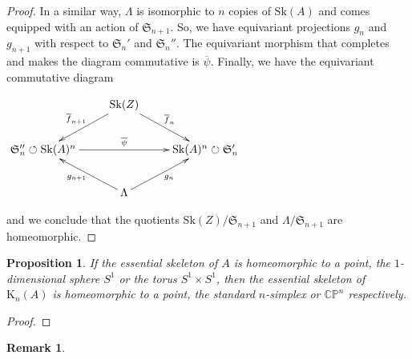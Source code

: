 \documentclass{amsart}%
\numberwithin{equation}{subsection}
\theoremstyle{plain2}
\newtheorem{prop}[equation]{Proposition}
\theoremstyle{definition2}
\newtheorem{rem}[equation]{Remark}
\theoremstyle{stepstyle}
\theoremstyle{point}
\theoremstyle{subpoint}
\newcommand{\CP}{\ensuremath{\mathbb{CP}}}
\newcommand{\Sk}{\mathrm{Sk}}
\begin{document}
\begin{proof}
In a similar way, $\Lambda$ is isomorphic to $n$ copies of $\Sk(A)$ and comes equipped with an action of $\mathfrak{S}_{n+1}$. So, we have equivariant projections $g_n$ and $g_{n+1}$ with respect to $\mathfrak{S}_n'$ and $\mathfrak{S}_n''$. The equivariant morphism that completes and makes the diagram commutative is $\overline{\psi}$. Finally, we have the equivariant commutative diagram
\begin{center}
\xymatrixrowsep{1pc}
\xymatrixrowsep{1pc}
$\xymatrix{
& \Sk(Z)  \ar[ld]_{\overline{f}_{n+1}} \ar[rd]^{\overline{f}_{n}}  &\\
\mathfrak{S}_n'' \circlearrowleft\Sk(A)^n  \ar[rr]^{\overline{\psi}}& & \Sk(A)^n\circlearrowright \mathfrak{S}_n' \\
& \Lambda\ar[lu]^{g_{n+1}}\ar[ru]_{g_n} &
}$
\end{center} and we conclude that the quotients $\Sk(Z)/\mathfrak{S}_{n+1}$ and $\Lambda/\mathfrak{S}_{n+1}$ are homeomorphic.
\end{proof}

\begin{prop} \label{prop top essential skeleton Kummer}
If the essential skeleton of $A$ is homeomorphic to a point, the $1$-dimensional sphere $S^1$ or the torus $S^1 \times S^1$, then the essential skeleton of $\text{K}_n(A)$ is homeomorphic to a point, the standard $n$-simplex or $\CP^n$ respectively. 
\end{prop}
\begin{proof}

\end{proof}
\begin{rem}

\end{rem}


\end{document}
